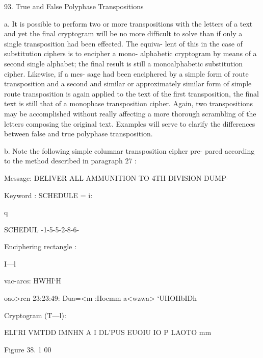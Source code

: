 {93. True and False Polyphase Transpositions

a. It is possible to perform two or more transpositions with the
letters of a text and yet the ﬁnal cryptogram will be no more difﬁcult
to solve than if only a single transposition had been effected. The equiva-
lent of this in the case of substitution ciphers is to encipher a mono-
alphabetic cryptogram by means of a second single alphabet; the ﬁnal
result is still a monoalphabetic substitution cipher. Likewise, if a mes-
sage had been enciphered by a simple form of route transposition
and a second and similar or approximately similar form of simple
route transposition is again applied to the text of the ﬁrst transposition,
the ﬁnal text is still that of a monophase transposition cipher. Again,
two transpositions may be accomplished without really affecting a more
thorough scrambling of the letters composing the original text. Examples
will serve to clarify the differences between false and true polyphase
transposition.

b. Note the following simple columnar transposition cipher pre-
pared according to the method described in paragraph 27 :

Message: DELIVER ALL AMMUNITION TO 4TH DIVISION
DUMP-

Keyword : SCHEDULE = i:

q

SCHEDUL
-1-5-5-2-8-6-

Enciphering rectangle :

I—l

 

 

 

 

 

vac-arcs:
HWHI‘H

oao>rcn
23:23:49:
Dua=<m
:Hocmm
a<wzwa>
‘UHOHbIDh

 

 

 

 

 

 

 

 

 

 

Cryptogram (T—l):

ELI'RI VMTDD IMNHN A I
DL'PUS EUOIU IO P LAOTO mm

Figure 38.
1 00

}
